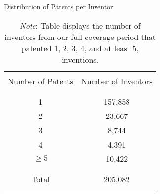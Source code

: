 \begin{table}[H]
\centering
\renewcommand{\arraystretch}{.6}
\caption{Distribution of Patents per Inventor}
\label{tab:patents_by_inventor}
\bigskip
\begin{tabular}{cc}
\hline
\\[-0.5em]
Number of Patents & Number of Inventors \\
\\[-0.5em]
\hline
\\[-0.5em]
1 & 157,858 \\
2 & 23,667 \\
3 & 8,744 \\
4 & 4,391 \\
$\geq 5$ & 10,422 \\
\\[-0.5em]
\hline
\\[-0.5em]
Total & 205,082 \\
\\[-0.5em]
\hline
\end{tabular}
\caption*{\textit{Note}: Table displays the number of inventors from our full coverage period that patented 1, 2, 3, 4, and at least 5, inventions.}
\end{table}